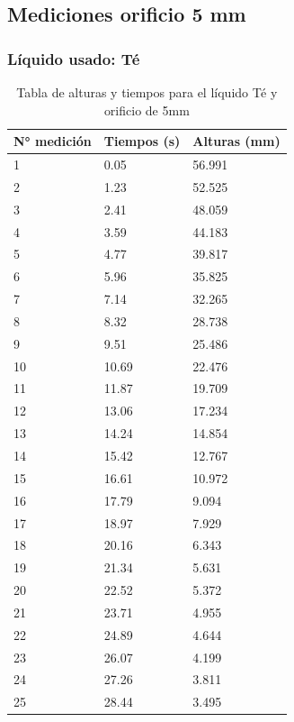\documentclass{article}
\begin{document}

\subsection{Mediciones orificio 5 mm}
\subsubsection{Líquido usado: Té}
\begin{table}[H]
    \begin{center}
        \begin{tabular}{ | m{2cm} | m{2cm} | m{2cm} | }
            \hline N° medición & Tiempos (s) & Alturas (mm) \\ 
            \hline 1 & 0.05 & 56.991 \\
            \hline 2 & 1.23 & 52.525 \\
            \hline 3 & 2.41 & 48.059 \\
            \hline 4 & 3.59 & 44.183 \\
            \hline 5 & 4.77 & 39.817 \\
            \hline 6 & 5.96 & 35.825 \\
            \hline 7 & 7.14 & 32.265 \\
            \hline 8 & 8.32 & 28.738 \\
            \hline 9 & 9.51 & 25.486 \\
            \hline 10 & 10.69 & 22.476 \\
            \hline 11 & 11.87 & 19.709 \\
            \hline 12 & 13.06 & 17.234 \\
            \hline 13 & 14.24 & 14.854 \\
            \hline 14 & 15.42 & 12.767 \\
            \hline 15 & 16.61 & 10.972 \\
            \hline 16 & 17.79 & 9.094 \\
            \hline 17 & 18.97 & 7.929 \\
            \hline 18 & 20.16 & 6.343 \\
            \hline 19 & 21.34 & 5.631 \\
            \hline 20 & 22.52 & 5.372 \\
            \hline 21 & 23.71 & 4.955 \\
            \hline 22 & 24.89 & 4.644 \\
            \hline 23 & 26.07 & 4.199 \\
            \hline 24 & 27.26 & 3.811 \\
            \hline 25 & 28.44 & 3.495 \\
            \hline
        \end{tabular}
    \end{center}
    \caption{Tabla de alturas y tiempos para el líquido Té y orificio de 5mm}
\end{table}
\end{document}
